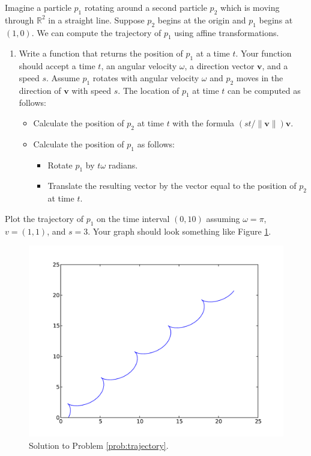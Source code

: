 \begin{problem}
Imagine a particle $p_1$ rotating around a second particle $p_2$ which is moving through $\mathbb{R}^2$ in a straight line. 
Suppose $p_2$ begins at the origin and $p_1$ begins at $(1, 0)$. 
We can compute the trajectory of $p_1$ using affine transformations.

\begin{enumerate}\label{prob:trajectory}
\item Write a function that returns the position of $p_1$ at a time $t$. 
Your function should accept a time $t$, an angular velocity $\omega$, a direction vector $\mathbf{v}$, and a speed $s$. 
Assume $p_1$ rotates with angular velocity $\omega$ and $p_2$ moves in the direction of $\mathbf{v}$ with speed $s$.
The location of $p_1$ at time $t$ can be computed as follows:
\begin{itemize}
\item Calculate the position of $p_2$ at time $t$ with the formula $(st/\|\mathbf{v}\|) \mathbf{v}$.
\item Calculate the position of $p_1$ as follows:
\begin{itemize}
\item Rotate $p_1$ by $t\omega$ radians.
\item Translate the resulting vector by the vector equal to the position of $p_2$ at time $t$.
\end{itemize}
\end{itemize}
\end{enumerate}
\item Plot the trajectory of $p_1$ on the time interval $(0, 10)$ assuming $\omega=\pi$, $v=(1, 1)$, and $s=3$. 
Your graph should look something like Figure \ref{fig:trajectory}.
\begin{figure}[H]
\includegraphics[width=\textwidth]{trajectory.pdf}
\caption{Solution to Problem \ref{prob:trajectory}.}
\label{fig:trajectory} 
\end{figure}
\end{problem}


